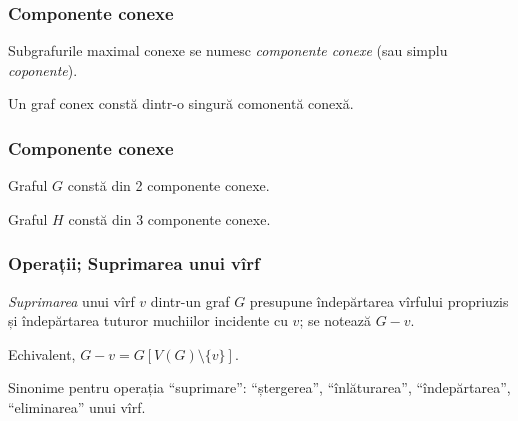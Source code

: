 \begin{frame}
  \frametitle{Componente conexe}

Subgrafurile maximal conexe se numesc \emph{componente conexe} (sau simplu \emph{coponente}).\pause

Un graf conex constă dintr-o singură comonentă conexă.

\end{frame}

\begin{frame}
  \frametitle{Componente conexe}

\begin{figure}
\centering%
\end{figure}

Graful $G$ constă din 2 componente conexe.

Graful $H$ constă din 3 componente conexe.

\end{frame}

\begin{frame}
  \frametitle{Operații; Suprimarea unui vîrf}

\emph{Suprimarea} unui vîrf $v$ dintr-un graf $G$ presupune îndepărtarea vîrfului propriuzis și îndepărtarea tuturor muchiilor incidente cu $v$; se notează $G-v$.\pause

Echivalent, $G-v=G[V(G)\setminus\{v\}]$.\pause

\begin{figure}
\end{figure}

Sinonime pentru operația ``suprimare'': ``ștergerea'', ``înlăturarea'', ``îndepărtarea'', ``eliminarea'' unui vîrf.

\end{frame}

